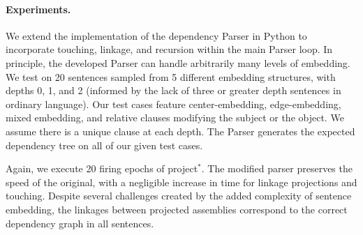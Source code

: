 \documentclass[11pt]{article}
\begin{document}

\paragraph{Experiments.} We extend the implementation of the dependency Parser in Python to incorporate touching, linkage, and recursion within the main Parser loop. In principle, the developed Parser can handle arbitrarily many levels of embedding. We test on 20 sentences sampled from 5 different embedding structures, with depths 0, 1, and 2 (informed by the lack of three or greater depth sentences in ordinary language). Our test cases feature center-embedding, edge-embedding, mixed embedding, and relative clauses modifying the subject or the object. We assume there is a unique clause at each depth. The Parser generates the expected dependency tree on all of our given test cases. %

Again, we execute 20 firing epochs of project$^*$. The modified parser preserves the speed of the original, with a negligible increase in time for linkage projections and touching.  Despite several challenges created by the added complexity of sentence embedding, the linkages between projected assemblies correspond to the correct dependency graph in all sentences.
\end{document}
